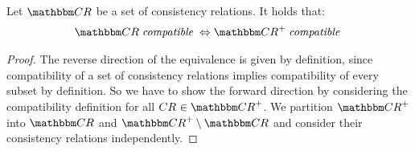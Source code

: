 \begin{lemma} \label{lemma:compatibilitytransitiveclosure}
    Let $\consistencyrelationset{CR}$ be a set of consistency relations.
    It holds that:
    \begin{align*}
        \consistencyrelationset{CR} \compatiblemath \equivalent
        \transitiveclosure{\consistencyrelationset{CR}} \compatiblemath
    \end{align*}
\end{lemma}

\begin{proof}
    The reverse direction of the equivalence is given by definition, since compatibility of a set of consistency relations implies compatibility of every subset by definition.
    So we have to show the forward direction by considering the compatibility definition for all $\consistencyrelation{CR}{} \in \transitiveclosure{\consistencyrelationset{CR}}$.
    We partition $\transitiveclosure{\consistencyrelationset{CR}}$ into $\consistencyrelationset{CR}$ and $\transitiveclosure{\consistencyrelationset{CR}} \setminus \consistencyrelationset{CR}$ and consider their consistency relations independently.
    

\end{proof}

